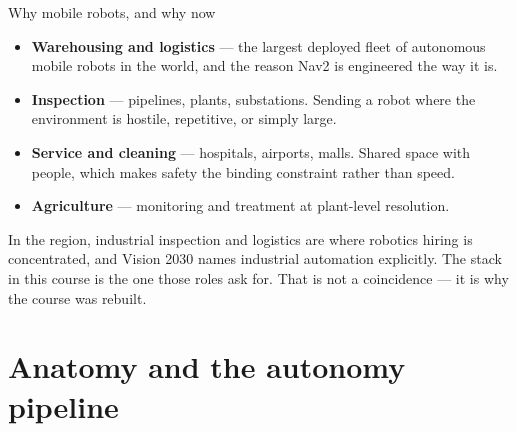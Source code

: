 \documentclass[aspectratio=169]{beamer}
\begin{document}
\begin{frame}{Why mobile robots, and why now}
  \begin{itemize}
    \item \textbf{Warehousing and logistics} --- the largest deployed fleet of autonomous
          mobile robots in the world, and the reason Nav2 is engineered the way it is.
    \item \textbf{Inspection} --- pipelines, plants, substations. Sending a robot where the
          environment is hostile, repetitive, or simply large.
    \item \textbf{Service and cleaning} --- hospitals, airports, malls. Shared space with
          people, which makes safety the binding constraint rather than speed.
    \item \textbf{Agriculture} --- monitoring and treatment at plant-level resolution.
  \end{itemize}

  \vspace{0.7em}
  \begin{inthefield}
    \footnotesize
    In the region, industrial inspection and logistics are where robotics hiring is
    concentrated, and Vision 2030 names industrial automation explicitly. The stack in this
    course is the one those roles ask for. That is not a coincidence --- it is why the course
    was rebuilt.
  \end{inthefield}
\end{frame}

\section{Anatomy and the autonomy pipeline}
\end{document}
